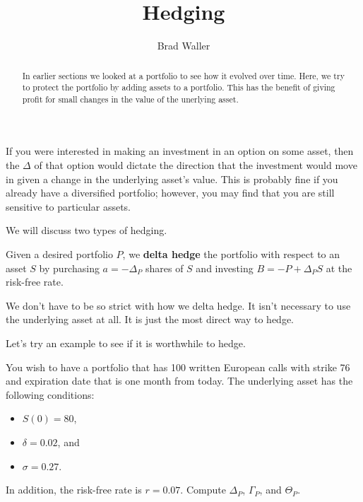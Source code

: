 \documentclass{ximera}
\author{Brad Waller}
\title{Hedging}
\begin{document}
\begin{abstract}
In earlier sections we looked at a portfolio to see how it evolved over time. Here, we try to protect the portfolio by adding assets to a portfolio. This has the benefit of giving profit for small changes in the value of the unerlying asset. 
\end{abstract}

\maketitle

If you were interested in making an investment in an option on some asset, then the $\Delta$ of that option would dictate the direction that the investment would move in given a change in the underlying asset's value. This is probably fine if you already have a diversified portfolio; however, you may find that you are still sensitive to particular assets.

We will discuss two types of hedging.

\begin{definition}
Given a desired portfolio $P$, we {\bf delta hedge} the portfolio with respect to an asset $S$ by purchasing $a=-\Delta_P$ shares of $S$ and investing $B=-P+\Delta_PS$ at the risk-free rate.
\end{definition}

\begin{remark}
We don't have to be so strict with how we delta hedge. It isn't necessary to use the underlying asset at all. It is just the most direct way to hedge. 
\end{remark}

Let's try an example to see if it is worthwhile to hedge.

\begin{example}
You wish to have a portfolio that has 100 written European calls with strike 76 and expiration date that is one month from today. The underlying asset has the following conditions:
	\begin{itemize}
	\item $S(0)=80$,\\
	\item $\delta=0.02$, and\\
	\item $\sigma=0.27$.
	\end{itemize}
In addition, the risk-free rate is $r=0.07$. Compute $\Delta_P$, $\Gamma_P$, and $\Theta_P$.
\end{example}
\end{document}
